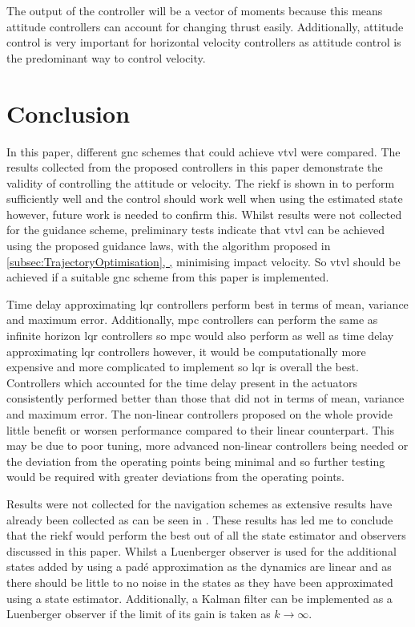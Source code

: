 \documentclass{article}
\newcommand*{\fullref}[1]{\hyperref[{#1}]{\autoref*{#1}, \nameref*{#1},}} %
\begin{document}
The output of the controller will be a vector of moments because this means \gls{attitude} controllers can account for changing thrust easily.
Additionally, \gls{attitude} control is very important for horizontal velocity controllers as \gls{attitude} control is the predominant way to control velocity.





%
\section{Conclusion}
In this paper, different \gls{gnc} schemes that could achieve \gls{vtvl} were compared.
The results collected from the proposed controllers in this paper demonstrate the validity of controlling the \gls{attitude} or velocity. 
The \gls{riekf} is shown in \cite{Zam2015,Kok2017,Mad2011} to perform sufficiently well and the control should work well when using the estimated state however, future work is needed to confirm this.
Whilst results were not collected for the guidance scheme, preliminary tests indicate that \gls{vtvl} can be achieved using the proposed guidance laws, with the algorithm proposed in \fullref{subsec:TrajectoryOptimisation} minimising impact velocity.
So \gls{vtvl} should be achieved if a suitable \gls{gnc} scheme from this paper is implemented.

Time delay approximating \gls{lqr} controllers perform best in terms of mean, variance and maximum error.
Additionally, \gls{mpc} controllers can perform the same as infinite horizon \gls{lqr} controllers so \gls{mpc} would also perform as well as time delay approximating \gls{lqr} controllers however, it would be computationally more expensive and more complicated to implement so \gls{lqr} is overall the best.
Controllers which accounted for the time delay present in the actuators consistently performed better than those that did not in terms of mean, variance and maximum error.
The non-linear controllers proposed on the whole provide little benefit or worsen performance compared to their linear counterpart.
This may be due to poor tuning, more advanced non-linear controllers being needed or the deviation from the operating points being minimal and so further testing would be required with greater deviations from the operating points.

Results were not collected for the navigation schemes as extensive results have already been collected as can be seen in \cite{Zam2015,Kok2017,Mad2011}.
These results has led me to conclude that the \gls{riekf} would perform the best out of all the state estimator and observers discussed in this paper.
Whilst a Luenberger observer is used for the additional states added by using a padé approximation as the dynamics are linear and as there should be little to no noise in the states as they have been approximated using a state estimator.
Additionally, a Kalman filter can be implemented as a Luenberger observer if the limit of its gain is taken as $k \to \infty$.
\end{document}
